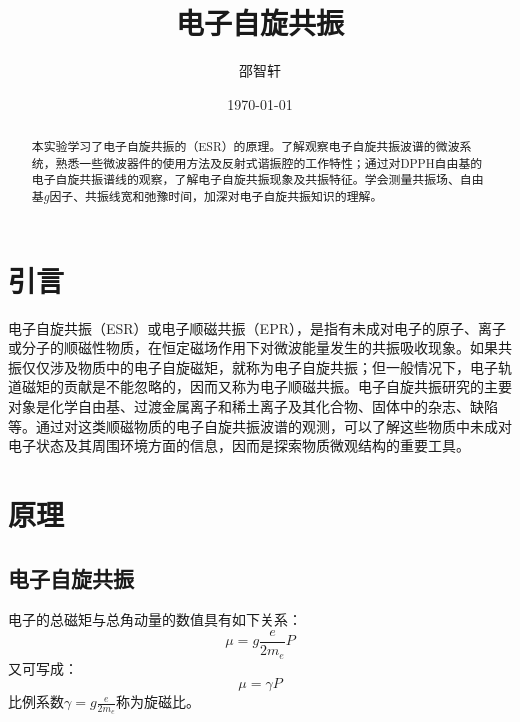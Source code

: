 \documentclass[aps,pre,12pt,preprint,onecolumn,showpacs,showkeys]{revtex4-1}
\begin{document}
\title{\bf\heiti{}电子自旋共振\vspace{15mm}}
\author{\fangsong{}邵智轩\vspace{2mm}}
\date{\today}

\begin{abstract}
\vspace{10mm}
\begin{spacing}{1.5}
\songti{}
    本实验学习了电子自旋共振的（ESR）的原理。了解观察电子自旋共振波谱的微波系统，熟悉一些微波器件的使用方法及反射式谐振腔的工作特性；通过对DPPH自由基的电子自旋共振谱线的观察，了解电子自旋共振现象及共振特征。学会测量共振场、自由基$g$因子、共振线宽和弛豫时间，加深对电子自旋共振知识的理解。

\end{spacing}
\end{abstract}
\maketitle
\songti{}

\section{引言}
    电子自旋共振（ESR）或电子顺磁共振（EPR），是指有未成对电子的原子、离子或分子的顺磁性物质，在恒定磁场作用下对微波能量发生的共振吸收现象。如果共振仅仅涉及物质中的电子自旋磁矩，就称为电子自旋共振；但一般情况下，电子轨道磁矩的贡献是不能忽略的，因而又称为电子顺磁共振。电子自旋共振研究的主要对象是化学自由基、过渡金属离子和稀土离子及其化合物、固体中的杂志、缺陷等。通过对这类顺磁物质的电子自旋共振波谱的观测，可以了解这些物质中未成对电子状态及其周围环境方面的信息，因而是探索物质微观结构的重要工具。

\section{原理}
    \subsection{电子自旋共振}
    电子的总磁矩与总角动量的数值具有如下关系：
    \begin{equation}
        \mu=g \frac{e}{2 m_e} P
    \end{equation}
    又可写成：
    \begin{equation}
        \mu =\gamma P
    \end{equation}
    比例系数$\gamma=g \frac{e} {2 m_e}$称为旋磁比。
\end{document}
